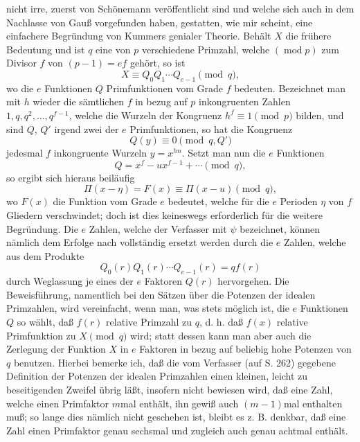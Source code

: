 \documentclass[11pt]{article}
\newcommand{\origpage}[1]{\par\vspace{0.25em}\noindent{\footnotesize\itshape [Gedruckte Seite #1]}\par\vspace{0.25em}}
\begin{document}
\origpage{418}
nicht irre, zuerst von Schönemann veröffentlicht sind und welche sich auch in dem Nachlasse von Gauß vorgefunden haben, gestatten, wie mir scheint, eine einfachere Begründung von Kummers genialer Theorie. Behält $X$ die frühere Bedeutung und ist $q$ eine von $p$ verschiedene Primzahl, welche $(\operatorname{mod} p)$ zum Divisor $f$ von $(p-1)=ef$ gehört, so ist
\[
 X\equiv Q_0Q_1\cdots Q_{e-1}\pmod q,
\]
wo die $e$ Funktionen $Q$ Primfunktionen vom Grade $f$ bedeuten. Bezeichnet man mit $h$ wieder die sämtlichen $f$ in bezug auf $p$ inkongruenten Zahlen $1,q,q^2,\ldots,q^{f-1}$, welche die Wurzeln der Kongruenz $h^f\equiv1\pmod p$ bilden, und sind $Q$, $Q'$ irgend zwei der $e$ Primfunktionen, so hat die Kongruenz
\[
 Q(y)\equiv0\pmod {q,Q'}
\]
jedesmal $f$ inkongruente Wurzeln $y=x^{hn}$. Setzt man nun die $e$ Funktionen
\[
 Q=x^f-ux^{f-1}+\cdots \pmod q,
\]
so ergibt sich hieraus beiläufig
\[
 \Pi(x-\eta)=F(x)\equiv\Pi(x-u)\pmod q,
\]
wo $F(x)$ die Funktion vom Grade $e$ bedeutet, welche für die $e$ Perioden $\eta$ von $f$ Gliedern verschwindet; doch ist dies keineswegs erforderlich für die weitere Begründung. Die $e$ Zahlen, welche der Verfasser mit $\psi$ bezeichnet, können nämlich dem Erfolge nach vollständig ersetzt werden durch die $e$ Zahlen, welche aus dem Produkte
\[
 Q_0(r)Q_1(r)\cdots Q_{e-1}(r)=qf(r)
\]
durch Weglassung je eines der $e$ Faktoren $Q(r)$ hervorgehen. Die Beweisführung, namentlich bei den Sätzen über die Potenzen der idealen Primzahlen, wird vereinfacht, wenn man, was stets möglich ist, die $e$ Funktionen $Q$ so wählt, daß $f(r)$ relative Primzahl zu $q$, d. h. daß $f(x)$ relative Primfunktion zu $X\pmod q$ wird; statt dessen kann man aber auch die Zerlegung der Funktion $X$ in $e$ Faktoren in bezug auf beliebig hohe Potenzen von $q$ benutzen. Hierbei bemerke ich, daß die vom Verfasser (auf S. 262) gegebene Definition der Potenzen der idealen Primzahlen einen kleinen, leicht zu beseitigenden Zweifel übrig läßt, insofern nicht bewiesen wird, daß eine Zahl, welche einen Primfaktor $m$mal enthält, ihn gewiß auch $(m-1)$mal enthalten muß; so lange dies nämlich nicht geschehen ist, bleibt es z. B. denkbar, daß eine Zahl einen Primfaktor genau sechsmal und zugleich auch genau achtmal enthält.
\end{document}
